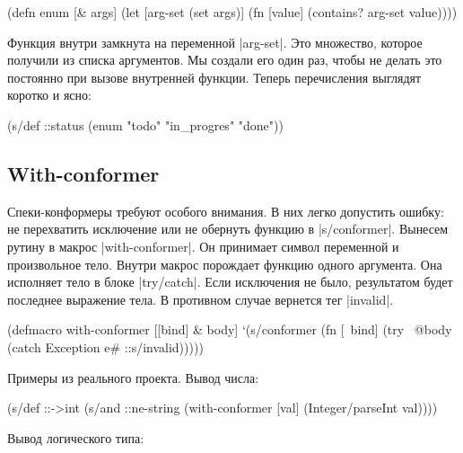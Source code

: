 \begin{english}
  \begin{clojure}
(defn enum [& args]
  (let [arg-set (set args)]
    (fn [value]
      (contains? arg-set value))))
  \end{clojure}
\end{english}

Функция внутри замкнута на переменной \spverb|arg-set|. Это множество, которое
получили из списка аргументов. Мы создали его один раз, чтобы не делать это
постоянно при вызове внутренней функции. Теперь перечисления выглядят коротко и
ясно:

\begin{english}
  \begin{clojure}
(s/def ::status
  (enum "todo" "in_progres" "done"))
  \end{clojure}
\end{english}

\subsection{With-conformer}

Спеки-конформеры требуют особого внимания. В них легко допустить ошибку: не
перехватить исключение или не обернуть функцию в \spverb|s/conformer|. Вынесем
рутину в макрос \spverb|with-conformer|. Он принимает символ переменной и
произвольное тело. Внутри макрос порождает функцию одного аргумента. Она
исполняет тело в блоке \spverb|try/catch|. Если исключения не было, результатом
будет последнее выражение тела. В противном случае вернется тег
\spverb|invalid|.

\begin{english}
  \begin{clojure}
(defmacro with-conformer
  [[bind] & body]
  `(s/conformer
    (fn [~bind]
      (try
        ~@body
        (catch Exception e#
          ::s/invalid)))))
  \end{clojure}
\end{english}

\noindent
Примеры из реального проекта. Вывод числа:

\begin{english}
  \begin{clojure}
(s/def ::->int
  (s/and
   ::ne-string
   (with-conformer [val]
     (Integer/parseInt val))))
  \end{clojure}
\end{english}

\noindent
Вывод логического типа:

